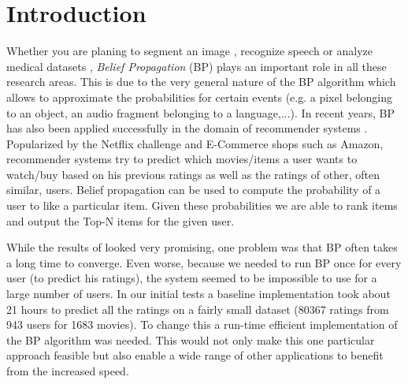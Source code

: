 
\section{Introduction}\label{sec:intro}

Whether you are planing to segment an image \cite{1544822}, recognize speech \cite{5373446} or analyze medical datasets \cite{bailly2011finding}, \textit{Belief Propagation} (BP) plays an important role in all these research areas. This is due to the very general nature of the BP algorithm which allows to approximate the probabilities for certain events (e.g. a pixel belonging to an object, an audio fragment belonging to a language,...). In recent years, BP has also been applied successfully in the domain of recommender systems \cite{Ha:2012:TRT:2396761.2398636}. Popularized by the Netflix challenge and E-Commerce shops such as Amazon, recommender systems try to predict which movies/items a user wants to watch/buy based on his previous ratings as well as the ratings of other, often similar, users. Belief propagation can be used to compute the probability of a user to like a particular item. Given these probabilities we are able to rank items and output the Top-N items for the given user.

 




While the results of \cite{Ha:2012:TRT:2396761.2398636} looked very promising, one problem was that BP often takes a long time to converge. Even worse, because we needed to run BP once for every user (to predict his ratings), the system seemed to be impossible to use for a large number of users. In our initial tests a baseline implementation took about 21 hours to predict all the ratings on a fairly small dataset (80367 ratings from 943 users for 1683 movies). To change this a run-time efficient implementation of the BP algorithm was needed.
This would not only make this one particular approach feasible but also enable a wide range of other applications to benefit from the increased speed.

